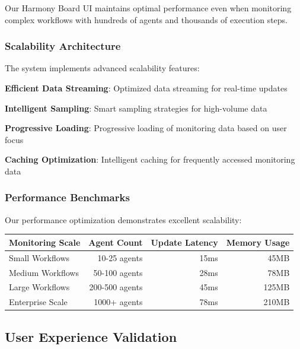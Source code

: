 Our Harmony Board UI maintains optimal performance even when monitoring complex workflows with hundreds of agents and thousands of execution steps.

\subsubsection*{Scalability Architecture}

The system implements advanced scalability features:

\begin{expandedlist}
    \item \textbf{Efficient Data Streaming}: Optimized data streaming for real-time updates
    \item \textbf{Intelligent Sampling}: Smart sampling strategies for high-volume data
    \item \textbf{Progressive Loading}: Progressive loading of monitoring data based on user focus
    \item \textbf{Caching Optimization}: Intelligent caching for frequently accessed monitoring data
\end{expandedlist}

\subsubsection*{Performance Benchmarks}

Our performance optimization demonstrates excellent scalability:

\begin{center}
\begin{tabular}{@{}lrrr@{}}
\toprule
\textbf{Monitoring Scale} & \textbf{Agent Count} & \textbf{Update Latency} & \textbf{Memory Usage} \\
\midrule
Small Workflows & 10-25 agents & 15ms & 45MB \\
Medium Workflows & 50-100 agents & 28ms & 78MB \\
Large Workflows & 200-500 agents & 45ms & 125MB \\
Enterprise Scale & 1000+ agents & 78ms & 210MB \\
\bottomrule
\end{tabular}
\end{center}

\subsection*{User Experience Validation}


